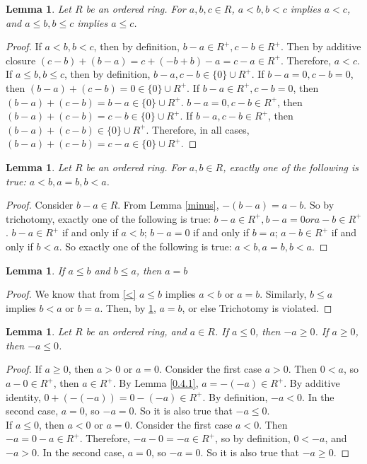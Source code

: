 \documentclass{article}
\newtheorem{lem}[thm]{Lemma}
\begin{document}
\begin{lem}
\label{0.8}
Let $R$ be an ordered ring. For $a,b,c\in R$, $a<b, b<c$ implies $a<c$, and $a\leq b, b\leq c$ implies $ a \leq c$.
\end{lem}

\begin{proof}
If $a<b, b<c$, then by definition, $b-a \in R^+, c-b \in R^+$. Then by additive closure $(c-b)+(b-a)=c+(-b+b)-a=c-a \in R^+$. Therefore, $a<c$. \\

If $a \leq b, b \leq c$, then by definition, $b-a, c-b \in \{0\} \cup R^+$. If $b-a=0, c-b=0$, then $(b-a)+(c-b)=0\in \{0\} \cup R^+$. If $b-a \in R^+, c-b=0$, then $(b-a)+(c-b)=b-a\in \{0\} \cup R^+$. $b-a=0, c-b\in R^+$, then $(b-a)+(c-b)=c-b\in \{0\} \cup R^+$. If $b-a,c-b\in R^+$, then $(b-a)+(c-b)\in \{0\}\cup R^+$. Therefore, in all cases, $(b-a)+(c-b)=c-a \in \{0\} \cup R^+$.
\end{proof}

\begin{lem}
\label{0.9}
Let $R$ be an ordered ring. For $a, b \in R$, exactly one of the following is true: $a<b, a=b, b<a$.
\end{lem}

\begin{proof}
Consider $b-a \in R$. From Lemma \ref{minus}, $-(b-a)=a-b$. So by trichotomy, exactly one of the following is true: $b-a \in R^+, b-a=0 or a-b\in R^+$. $b-a \in R^+$ if and only if $a<b$; $b-a=0$ if and only if $b=a$; $a-b \in R^+$ if and only if $b<a$. So exactly one of the following is true: $a<b, a=b, b<a$.

\end{proof}
\begin{lem}
\label{0.9.1}
If $a\leq b$ and $b\leq a$, then $a=b$
\end{lem}
\begin{proof}
We know that from \ref{<} $a\leq b$ implies $a<b$ or $a=b$. Similarly, $b\leq a$ implies $b<a$ or $b=a$. Then, by \ref{0.9}, $a=b$, or else Trichotomy is violated. 
\end{proof}




\begin{lem}
\label{0.10.3}
Let $R$ be an ordered ring, and $a \in R$. If $a\leq 0$, then $-a\geq0$. If $a\geq 0$, then $-a\leq0$.
\end{lem}
\begin{proof}
If $a \geq 0$, then $a>0$ or $a=0$. Consider the first case $a>0$. Then $0<a$, so $a-0 \in R^+$, then $a\in R^+$. By Lemma \ref{0.4.1}, $a=-(-a)\in R^+$. By additive identity, $0+(-(-a))=0-(-a) \in R^+$. By definition, $-a<0$. In the second case, $a=0$, so $-a=0$. So it is also true that $-a \leq 0$. \\

If $a \leq 0$, then $a<0$ or $a=0$. Consider the first case $a<0$. Then $-a=0-a\in R^+$. Therefore, $-a-0=-a\in R^+$, so by definition, $0 < -a$, and $-a > 0$. In the second case, $a=0$, so $-a=0$. So it is also true that $-a \geq 0$. 
\end{proof}
\end{document}
